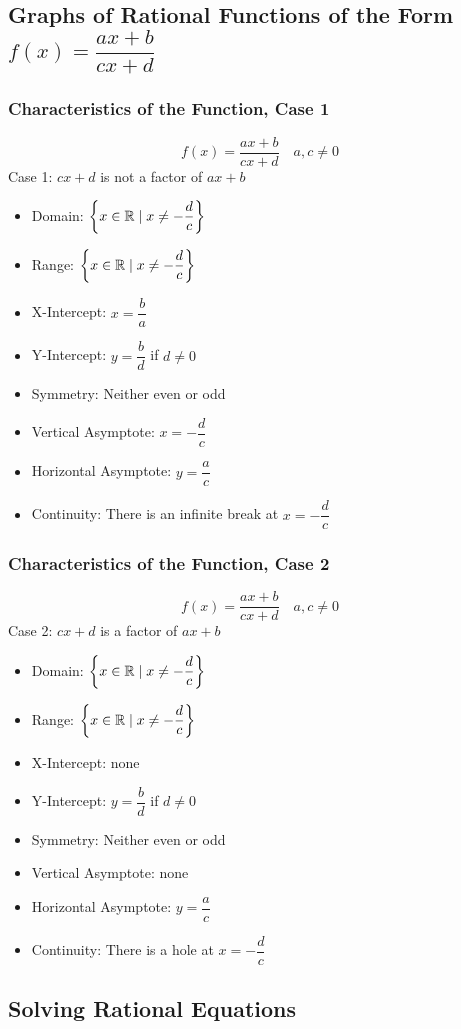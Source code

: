 \documentclass{article}
\begin{document}
	\subsection{Graphs of Rational Functions of the Form $f(x)=\dfrac{ax+b}{cx+d}$}
	\subsubsection{Characteristics of the Function, Case 1}
	\[f(x)=\frac{ax+b}{cx+d}\quad a,c\ne0\]
	Case 1: $cx+d$ is not a factor of $ax+b$
	\begin{itemize}
		\item Domain: $\set{x\in\mathbb{R}\mid x\ne-\dfrac{d}{c}}$
		\item Range: $\set{x\in\mathbb{R}\mid x\ne-\dfrac{d}{c}}$
		\item X-Intercept: $x=\dfrac{b}{a}$
		\item Y-Intercept: $y=\dfrac{b}{d}$ if $d\ne0$
		\item Symmetry: Neither even or odd
		\item Vertical Asymptote: $x=-\dfrac{d}{c}$
		\item Horizontal Asymptote: $y=\dfrac{a}{c}$
		\item Continuity: There is an infinite break at $x=-\dfrac{d}{c}$
	\end{itemize}
	\subsubsection{Characteristics of the Function, Case 2}
	\[f(x)=\frac{ax+b}{cx+d}\quad a,c\ne0\]
	Case 2: $cx+d$ is a factor of $ax+b$
	\begin{itemize}
		\item Domain: $\set{x\in\mathbb{R}\mid x\ne-\dfrac{d}{c}}$
		\item Range: $\set{x\in\mathbb{R}\mid x\ne-\dfrac{d}{c}}$
		\item X-Intercept: none
		\item Y-Intercept: $y=\dfrac{b}{d}$ if $d\ne0$
		\item Symmetry: Neither even or odd
		\item Vertical Asymptote: none
		\item Horizontal Asymptote: $y=\dfrac{a}{c}$
		\item Continuity: There is a hole at $x=-\dfrac{d}{c}$
	\end{itemize}
	\subsection{Solving Rational Equations}
\end{document}
